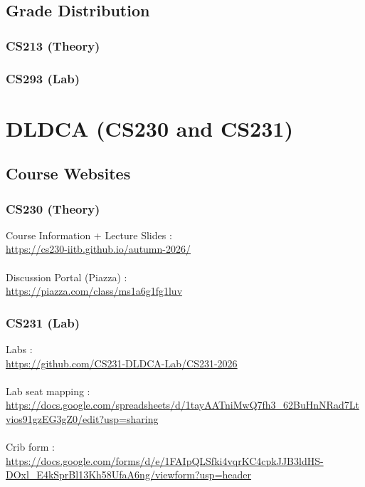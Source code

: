 \documentclass{article}
\begin{document}
    \subsection{Grade Distribution}

        \subsubsection{CS213 (Theory)}

        \subsubsection{CS293 (Lab)}

    

\pagebreak


\section{DLDCA (CS230 and CS231)}

    \subsection{Course Websites}

        \subsubsection{CS230 (Theory)}
        Course Information + Lecture Slides : \\\url{https://cs230-iitb.github.io/autumn-2026/}\\\\
        Discussion Portal (Piazza) : \\\url{https://piazza.com/class/ms1a6g1fg1luv}

        \subsubsection{CS231 (Lab)}
        Labs : \\
        \url{https://github.com/CS231-DLDCA-Lab/CS231-2026}
        \\\\
        Lab seat mapping : \\\url{https://docs.google.com/spreadsheets/d/1tayAATniMwQ7fh3_62BuHnNRad7Ltvios91gzEG3gZ0/edit?usp=sharing}
        \\\\
        Crib form : \\\url{https://docs.google.com/forms/d/e/1FAIpQLSfki4vqrKC4cpkJJB3ldHS-DOxl_E4kSprBl13Kh58UfaA6ng/viewform?usp=header}
\end{document}
